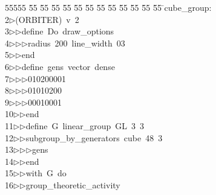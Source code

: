 %
%
\begin{tabbing}
55555 \= 55 \= 55 \= 55 \= 55 \= 55 \= 55 \= 55 \= 55 \= 55 \= 55 \= 55 \= 55 \= \>cube\_group:\\[0pt]
2\>$\triangleright$\>(ORBITER)\ v\ 2\ \\[0pt]
3\>$\triangleright$\>$\triangleright$\>define\ Do\ draw\_options\ \\[0pt]
4\>$\triangleright$\>$\triangleright$\>$\triangleright$\>radius\ 200\ line\_width\ 03\ \\[0pt]
5\>$\triangleright$\>$\triangleright$\>end\ \\[0pt]
6\>$\triangleright$\>$\triangleright$\>define\ gens\ vector\ dense\ \\[0pt]
7\>$\triangleright$\>$\triangleright$\>$\triangleright$\>010200001\ \\[0pt]
8\>$\triangleright$\>$\triangleright$\>$\triangleright$01010200\ \\[0pt]
9\>$\triangleright$\>$\triangleright$\>$\triangleright$00010001\ \\[0pt]
10\>$\triangleright$\>$\triangleright$\>end\ \\[0pt]
11\>$\triangleright$\>$\triangleright$\>define\ G\ linear\_group\ GL\ 3\ 3\ \\[0pt]
12\>$\triangleright$\>$\triangleright$\>subgroup\_by\_generators\ cube\ 48\ 3\ \\[0pt]
13\>$\triangleright$\>$\triangleright$\>$\triangleright$\>gens\ \\[0pt]
14\>$\triangleright$\>$\triangleright$\>end\ \\[0pt]
15\>$\triangleright$\>$\triangleright$\>with\ G\ do\ \\[0pt]
16\>$\triangleright$\>$\triangleright$\>group\_theoretic\_activity\ \\[0pt]

\end{tabbing}
